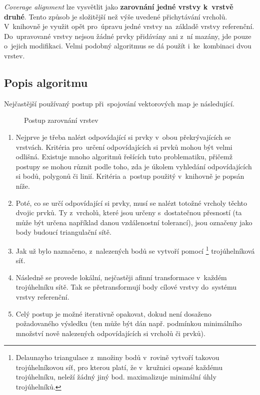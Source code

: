 \textit{Coverage alignment} lze vysvětlit jako \textbf{zarovnání jedné vrstvy 
k~vrstvě druhé}. Tento způsob je složitější než výše uvedené přichytávání vrcholů.
V~knihovně  je využit opět pro~úpravu jedné vrstvy na~základě vrstvy 
referenční. Do~upravované vrstvy nejsou žádné prvky přidávány ani z~ní mazány,
jde pouze o~jejich modifikaci. Velmi podobný algoritmus se dá použít 
i~ke~kombinaci dvou vrstev.

\subsection{Popis algoritmu}
\label{ca-algoritmus}

Nejčastější používaný postup při~spojování vektorových map je následující.

  \begin{figure}[H]
    \centering
      
      \caption{Postup zarovnání vrstev}
      \label{fig:ca-princip}
  \end{figure}

\begin{enumerate}
 \item Nejprve je třeba nalézt odpovídající si prvky v~obou překrývajících se 
    vrstvách. Kritéria pro~určení odpovídajících si prvků mohou být velmi 
    odlišná. Existuje mnoho algoritmů řešících tuto problematiku, přičemž 
    postupy se mohou různit podle toho, zda je úkolem vyhledání 
    odpovídajících si bodů, polygonů či linií. Kritéria a~postup použitý 
    v~knihovně  je popsán níže.
 \item Poté, co se určí odpovídající si prvky, musí se nalézt totožné vrcholy 
    těchto dvojic prvků. Ty z~vrcholů, které jsou určeny s~dostatečnou 
    přesností (ta může být určena například danou vzdálenostní tolerancí), 
    jsou označeny jako body budoucí triangulační sítě.
 \item Jak už bylo naznačeno, z~nalezených bodů se vytvoří pomocí 
    \footnote{Delaunayho triangulace z~množiny bodů v~rovině 
    vytvoří takovou trojúhelníkovou síť, pro kterou platí, že v~kružnici 
    opsané každému trojúhelníku, neleží žádný jiný bod.  maximalizuje
    minimální úhly trojúhelníků.} trojúhelníková síť. 
 \item Následně se provede lokální, nejčastěji afinní transformace v~každém 
    trojúhelníku sítě. Tak se přetransformují body cílové vrstvy do~systému 
    vrstvy referenční.
 \item Celý postup je možné iterativně opakovat, dokud není dosaženo 
    požadovaného výsledku (ten může být dán např. podmínkou minimálního 
    množství nově nale\-zených odpovídajících si vrcholů či prvků).
\end{enumerate}

